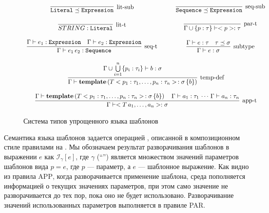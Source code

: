 \newcommand{\trule}[3]{%
\infer[\mbox{#3}]{#2}{#1}%
}%
%
\begin{figure}[htbp]
$$
\begin{array}{ccc}
\trule{}{\mathtt{Literal} \preceq \mathtt{Expression}}{lit-sub}
&&
\trule{}{\mathtt{Sequence} \preceq \mathtt{Expression}}{seq-sub}
\\
&&\,\\
\trule{}{STRING : \mathtt{Literal}}{lit-t}
&\quad&
\trule{}{\Gamma \cup \{p : \tau\} \vdash <p> : \tau}{par-t}
\\
&&\,\\
%
\trule{
	\Gamma \vdash e_1 : \mathtt{Expression} 
	\quad 
	\Gamma \vdash e_2 : \mathtt{Expression}
}{
	\Gamma \vdash e_1 \, e_2 : \mathtt{Sequence}
}{seq-t}
&&
\trule{
	\Gamma \vdash e : \tau
	\quad 
	\tau \preceq \sigma 
}{
	\Gamma \vdash e : \sigma
}{subtype}
\\
&&\,\\
\multicolumn{3}{c}{
\trule{
	\Gamma \cup \bigcup\limits_{i=1}^{n} \{ p_i : \tau_i \} \vdash b : \sigma
}{
	\Gamma \vdash \mathbf{template}\left(
		T <p_1 : \tau_1, \ldots, p_n : \tau_n> \,: \sigma \, \{ b \}
	\right)
}{temp-def}
}
\\
&&\,\\
\multicolumn{3}{c}{
\trule{
	\Gamma \vdash \mathbf{template}\left(
		T <p_1 : \tau_1, \ldots, p_n : \tau_n> \,: \sigma \, \{ b \}
	\right)
	\quad
	\Gamma \vdash a_1 : \tau_1 \, \cdots \, \Gamma \vdash a_n : \tau_n
}{
	\Gamma \vdash <T \, a_1, \ldots, a_n> : \sigma
}{app-t}
}
\end{array}
$$
	\caption{Система типов упрощенного языка шаблонов}\label{TempTypes}
\end{figure}

\newcommand{\Inst}[2]{\mathcal{I}_{#1} \left[ #2 \right]}%
Семантика языка шаблонов задается операцией , описанной в композиционном стиле правилами на . Мы обозначаем результат разворачивания шаблонов в выражении $e$ как $\Inst{\gamma}{e}$, где $\gamma$ (``'') является множеством значений параметров шаблонов вида $p = e$, где $p$ --- параметр, а $e$ --- шаблонное выражение. Как видно из правила \textsc{APP}, когда разворачивается применение шаблона, среда пополняется информацией о текущих значениях параметров, при этом само значение не разворачивается до тех пор, пока оно не будет использовано. Разворачивание значений использованных параметров выполняется в правиле \textsc{PAR}.

